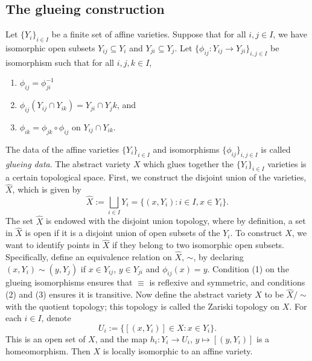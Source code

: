 \documentclass[12pt]{amsart}
\theoremstyle{plain}
\begin{document}
\subsection{The glueing construction}
Let $\{Y_i\}_{i\in I}$ be a finite set of affine varieties.
Suppose that for all $i, j \in I$, we have isomorphic open subsets $Y_{ij} \subseteq Y_i$ and $Y_{ji} \subseteq Y_j$.
Let $\{\phi_{ij} : Y_{ij} \to Y_{ji}\}_{i, j \in I}$ be isomorphism such that for all $i, j, k \in I$,
\begin{enumerate}
\item
$\phi_{ij} = \phi_{ji}^{-1}$

\item
$\phi_{ij}(Y_{ij} \cap Y_{ik}) = Y_{ji} \cap Y_jk$, and

\item
$\phi_{ik} = \phi_{jk} \circ \phi_{ij}$ on $Y_{ij} \cap Y_{ik}$.
\end{enumerate}
The data of the affine varieties $\{Y_i\}_{i\in I}$ and isomorphisms $\{\phi_{ij}\}_{i,j\in I}$ is called \emph{glueing data}.
The abstract variety $X$ which glues together the $\{Y_i\}_{i\in I}$ varieties is a certain topological space.
First, we construct the disjoint union of the varieties, $\hat X$, which is given by
$$\hat X := \bigsqcup_{i \in I} Y_i = \{(x, Y_i) : i \in I, x \in Y_i\}.$$
The set $\hat X$ is endowed with the disjoint union topology, where by definition, a set in $\hat X$ is open if it is a disjoint union of open subsets of the $Y_i$.
To construct $X$, we want to identify points in $\hat X$ if they belong to two isomorphic open subsets.
Specifically, define an equivalence relation on $\hat X$, $\sim$, by declaring $(x, Y_i) \sim (y, Y_j)$ if $x \in Y_{ij}$, $y\in Y_{ji}$ and $\phi_{ij}(x) = y$.
Condition (1) on the glueing isomorphisms ensures that $\equiv$ is reflexive and symmetric, and conditions (2) and (3) ensures it is transitive.
Now define the abstract variety $X$ to be $\hat X / \sim$ with the quotient topology;
this topology is called the Zariski topology on $X$.
For each $i \in I$, denote
$$U_i := \{[(x, Y_i)] \in X : x \in Y_i\}.$$
This is an open set of $X$, and the map $h_i : Y_i \to U_i$, $y \mapsto [(y, Y_i)]$ is a homeomorphism.
Then $X$ is locally isomorphic to an affine variety.
\end{document}
